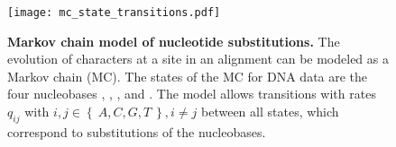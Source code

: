 \begin{figure}[hpbt]
    \centering
    \texttt{[image: mc\_state\_transitions.pdf]}
    \caption[Markov chain model of nucleotide substitutions]{
        \textbf{Markov chain model of nucleotide substitutions.}
        The evolution of characters at a site in an alignment can be modeled as a Markov chain (MC).
        The states of the MC for DNA data are the four nucleobases
        , , , and .
        The model allows transitions with rates $q_{ij}$ with $i,j \in \left\{~ A, C, G, T ~\right\}, i \neq j$ between all states,
        which correspond to substitutions of the nucleobases.
    }
    \label{fig:mc_state_transitions}
\end{figure}


